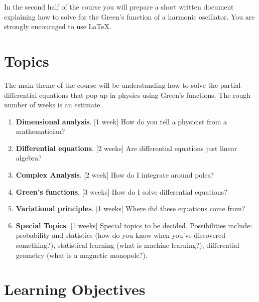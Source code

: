 \documentclass[12pt]{article}
\numberwithin{equation}{section}    %
\begin{document}
In the second half of the course you will prepare a short written document explaining how to solve for the Green's function of a harmonic oscillator. You are strongly encouraged to use \LaTeX. 


\section*{Topics}

The main theme of the course will be understanding how to solve the partial differential equations that pop up in physics using Green's functions. The rough number of weeks is an estimate.

\begin{enumerate}
	\item \textbf{Dimensional analysis}. [1 week] How do you tell a physicist from a mathematician?
	\item \textbf{Differential equations}. [2 weeks] Are differential equations just linear algebra?
	\item \textbf{Complex Analysis}. [2 week] How do I integrate around poles?
	\item \textbf{Green's functions}. [3 weeks] How do I solve differential equations? 
	\item \textbf{Variational principles}. [1 weeks] Where did these equations come from? 
	\item \textbf{Special Topics}. [1 weeks]  Special topics to be decided. Possibilities include: probability and statistics (how do you know when you've discovered something?), statistical learning (what is machine learning?), differential geometry (what is a magnetic monopole?).
\end{enumerate}

\section*{Learning Objectives}
\end{document}
